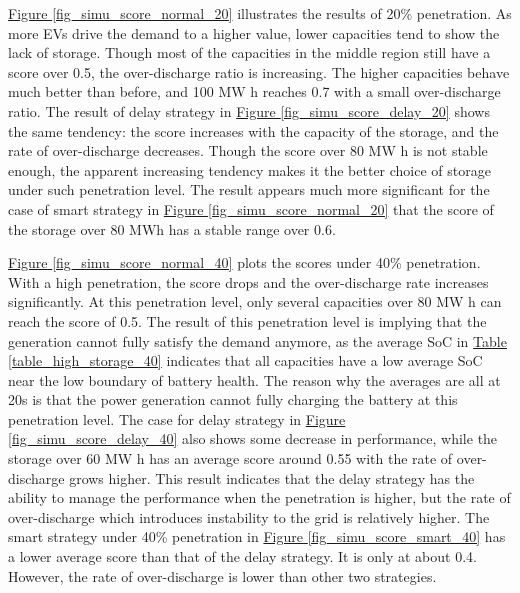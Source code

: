 \documentclass[12pt,a4paper]{report}
\begin{document}
        \hyperref[fig_simu_score_normal_20]{Figure \ref*{fig_simu_score_normal_20}} illustrates the results of 20\% penetration. As more EVs drive the demand to a higher value, lower capacities tend to show the lack of storage. Though most of the capacities in the middle region still have a score over 0.5, the over-discharge ratio is increasing. The higher capacities behave much better than before, and 100 MW h reaches 0.7 with a small over-discharge ratio.
        The result of delay strategy in \hyperref[fig_simu_score_delay_20]{Figure \ref*{fig_simu_score_delay_20}} shows the same tendency: the score increases with the capacity of the storage, and the rate of over-discharge decreases. Though the score over 80 MW h is not stable enough, the apparent increasing tendency makes it the better choice of storage under such penetration level.
        The result appears much more significant for the case of smart strategy in \hyperref[fig_simu_score_normal_20]{Figure \ref*{fig_simu_score_normal_20}} that the score of the storage over 80 MWh has a stable range over 0.6.
            
        \hyperref[fig_simu_score_normal_40]{Figure \ref*{fig_simu_score_normal_40}} plots the scores under 40\% penetration. With a high penetration, the score drops and the over-discharge rate increases significantly. At this penetration level, only several capacities over 80 MW h can reach the score of 0.5. The result of this penetration level is implying that the generation cannot fully satisfy the demand anymore, as the average SoC in \hyperref[table_high_storage_40]{Table \ref*{table_high_storage_40}} indicates that all capacities have a low average SoC near the low boundary of battery health. The reason why the averages are all at 20s is that the power generation cannot fully charging the battery at this penetration level.
        The case for delay strategy in \hyperref[fig_simu_score_delay_40]{Figure \ref*{fig_simu_score_delay_40}} also shows some decrease in performance, while the storage over 60 MW h has an average score around 0.55 with the rate of over-discharge grows higher. This result indicates that the delay strategy has the ability to manage the performance when the penetration is higher, but the rate of over-discharge which introduces instability to the grid is relatively higher.
        The smart strategy under 40\% penetration in \hyperref[fig_simu_score_smart_40]{Figure \ref*{fig_simu_score_smart_40}} has a lower average score than that of the delay strategy. It is only at about 0.4. However, the rate of over-discharge is lower than other two strategies.
\end{document}
